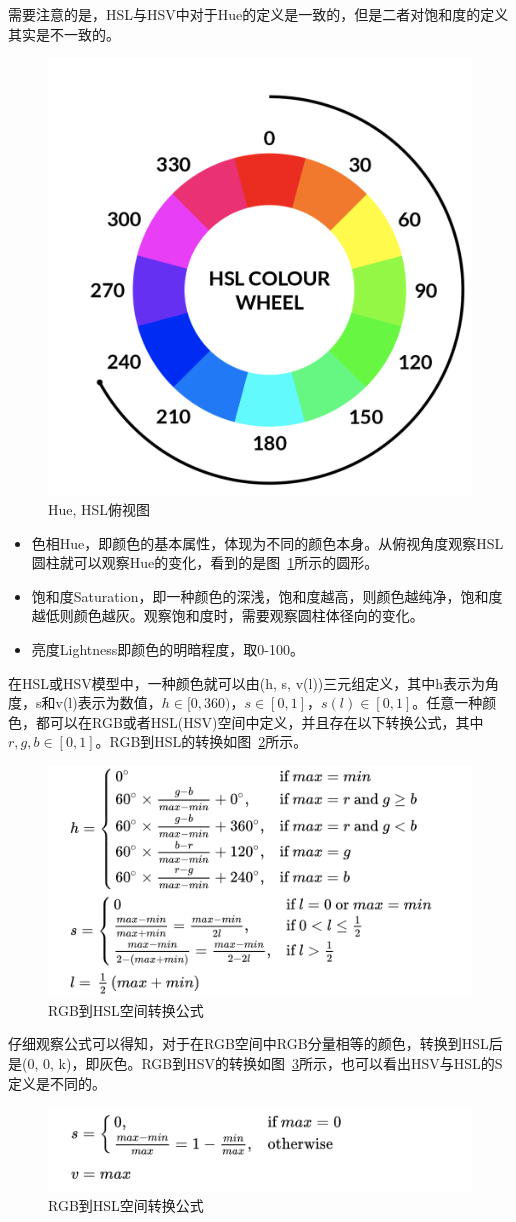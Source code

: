 \documentclass{ctexart}
\begin{document}
需要注意的是，HSL与HSV中对于Hue的定义是一致的，但是二者对饱和度的定义其实是不一致的。
\begin{figure}[h!]
    \centering
    \includegraphics[width=.5\linewidth]{imgs/HSL_H.png}
    \caption{Hue, HSL俯视图}
    \label{fig_hsl_h}
\end{figure}
\begin{itemize}
    \item 色相Hue，即颜色的基本属性，体现为不同的颜色本身。从俯视角度观察HSL圆柱就可以观察Hue的变化，看到的是图~\ref{fig_hsl_h}所示的圆形。
    \item 饱和度Saturation，即一种颜色的深浅，饱和度越高，则颜色越纯净，饱和度越低则颜色越灰。观察饱和度时，需要观察圆柱体径向的变化。
    \item 亮度Lightness即颜色的明暗程度，取0-100。
\end{itemize}
在HSL或HSV模型中，一种颜色就可以由(h, s, v(l))三元组定义，其中h表示为角度，s和v(l)表示为数值，$h\in[0, 360)$，$s\in[0, 1]$，$s(l)\in[0, 1]$。任意一种颜色，都可以在RGB或者HSL(HSV)空间中定义，并且存在以下转换公式，其中$r,g,b\in[0, 1]$。RGB到HSL的转换如图~\ref{fig_rq_rgb_to_hsl}所示。
\begin{figure}[h!]
    \centering
    \includegraphics[width=.7\linewidth]{imgs/eq_rgb_to_hsl.png}
    \caption{RGB到HSL空间转换公式}
    \label{fig_rq_rgb_to_hsl}
\end{figure}
仔细观察公式可以得知，对于在RGB空间中RGB分量相等的颜色，转换到HSL后是(0, 0, k)，即灰色。RGB到HSV的转换如图~\ref{fig_rq_rgb_to_hsv}所示，也可以看出HSV与HSL的S定义是不同的。
\begin{figure}[h!]
    \centering
    \includegraphics[width=.8\linewidth]{imgs/eq_rgb_to_hsv.png}
    \caption{RGB到HSL空间转换公式}
    \label{fig_rq_rgb_to_hsv}
\end{figure}
\end{document}
